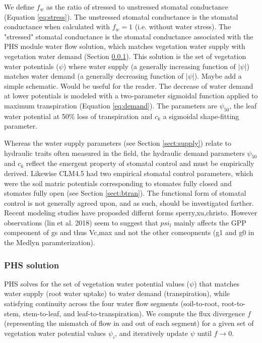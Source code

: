 \documentclass[draft,linenumbers]{agujournal}
\begin{document}
    We define $f_w$ as the ratio of stressed to unstressed stomatal conductance (Equation \ref{eq:stress}).
    The unstressed stomatal conductance is the stomatal conductance when calculated with $f_w=1$
    (i.e. without water stress). 
    The "stressed" stomatal conductance is the stomatal conductance associated with the PHS module
    water flow solution, which matches vegetation water supply with vegetation water demand 
    (Section \ref{sect:solution}).
    This solution is the set of vegetation water potentials ($\psi$) where water supply
    (a generally increasing function of $\left|\psi\right|$) matches water demand
    (a generally decreasing function of $\left|\psi\right|$). Maybe add a simple schematic. Would be useful for the reader.
    The decrease of water demand at lower potentials is modeled with a two-parameter sigmoidal function 
     applied to maximum transpiration (Equation \ref{eq:demand}). 
     The parameters are $\psi_{50}$, the leaf water potential at 50\% loss of transpiration and 
     $c_k$ a sigmoidal shape-fitting parameter.
     
     Whereas the water supply parameters (see Section \ref{sect:supply}) 
     relate to hydraulic traits often measured in the field, 
     the hydraulic demand parameters $\psi_{50}$ and $c_k$ reflect the emergent property of stomatal control
     and must be empirically derived. 
     Likewise CLM4.5 had two empirical stomatal control parameters, which were the soil matric potentials 
     corresponding to stomates fully closed and stomates fully open (see Section \ref{sect:btran}).
     The functional form of stomatal control is not generally agreed upon, and as such, 
     should be investigated farther. Recent modeling studies have proposded differnt forms sperry,xu,christo. However observations (lin et al. 2018) seem to suggest that $psi_l$ mainly affects the GPP compeonent of gs and thus Vc,max and not the other comeopnents (g1 and g0 in the Medlyn paramterization).

    \subsubsection{PHS solution}
    \label{sect:solution}
    
    PHS solves for the set of vegetation water potential values ($\psi$) that matches water supply
    (root water uptake) to water demand (transpiration), while satisfying continuity across the four water flow
    segments (soil-to-root, root-to-stem, stem-to-leaf, and leaf-to-transpiration). 
    We compute the flux divergence $f$ (representing the mismatch of flow in and out of each segment)
    for a given set of vegetation water potential values $\psi_i$, and iteratively update $\psi$ until $f\to0$.
    
\end{document}
